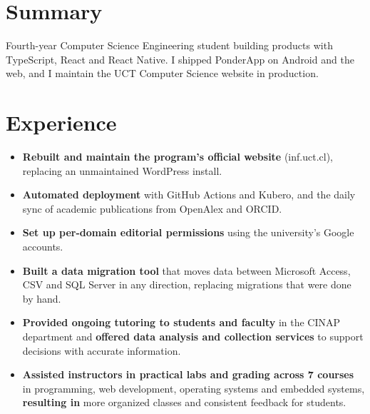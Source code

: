 \documentclass[english]{cv}
\begin{document}

\section{Summary}
Fourth-year Computer Science Engineering student building products
with TypeScript, React
and React Native. I shipped PonderApp on Android and the web, and I
maintain the UCT
Computer Science website in production.

\section{Experience}
\begin{itemize}
  \item \textbf{Rebuilt and maintain the program's official website}
    (inf.uct.cl), replacing an unmaintained WordPress install.
  \item \textbf{Automated deployment} with GitHub Actions and Kubero,
    and the daily sync of academic publications from OpenAlex and ORCID.
  \item \textbf{Set up per-domain editorial permissions} using the
    university's Google accounts.
\end{itemize}
\begin{itemize}
  \item \textbf{Built a data migration tool} that moves data between
    Microsoft Access, CSV and SQL Server in any direction, replacing
    migrations that were done by hand.
\end{itemize}
\begin{itemize}
  \item \textbf{Provided ongoing tutoring to students and faculty} in
    the CINAP department and \textbf{offered data analysis and
    collection services} to support decisions with accurate information.
\end{itemize}
\begin{itemize}
  \item \textbf{Assisted instructors in practical labs and grading
    across 7 courses} in programming, web development, operating
    systems and embedded systems, \textbf{resulting in} more
    organized classes and consistent feedback for students.
\end{itemize}
\end{document}
